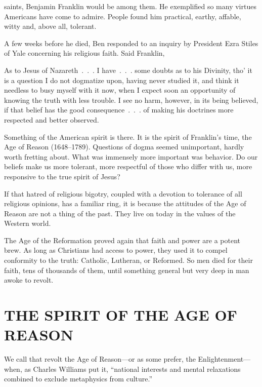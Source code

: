 
 saints, Benjamin Franklin would be among them. He exemplified so
many virtues Americans have come to admire. People found him practical, earthy, affable, witty and,
above all, tolerant.

A few weeks before he died, Ben responded to an inquiry by President Ezra Stiles of Yale concerning
his religious faith. Said Franklin,

\begin{blockquote}
As to Jesus of Nazareth~.~.~. I have~.~.~. some doubts as to his Divinity, tho’ it is a question I
do not dogmatize upon, having never studied it, and think it needless to busy myself with it now,
when I expect soon an opportunity of knowing the truth with less trouble. I see no harm, however, in
its being believed, if that belief has the good consequence~.~.~. of making his doctrines more
respected and better observed.
\end{blockquote}

Something of the American spirit is there. It is the spirit of Franklin’s time, the Age of Reason
(1648–1789). Questions of dogma seemed unimportant, hardly worth fretting about. What was immensely
more important was behavior. Do our beliefs make us more tolerant, more respectful of those who
differ with us, more responsive to the true spirit of Jesus?

If that hatred of religious bigotry, coupled with a devotion to tolerance of all religious opinions,
has a familiar ring, it is because the attitudes of the Age of Reason are not a thing of the past.
They live on today in the values of the Western world.

The Age of the Reformation proved again that faith and power are a potent brew. As long as
Christians had access to power, they used it to compel conformity to the truth: Catholic, Lutheran,
or Reformed. So men died for their faith, tens of thousands of them, until something general but
very deep in man awoke to revolt.

\section{THE SPIRIT OF THE AGE OF REASON}

We call that revolt the Age of Reason—or as some prefer, the Enlightenment—when, as Charles Williams
put it, “national interests and mental relaxations combined to exclude metaphysics from culture.”

